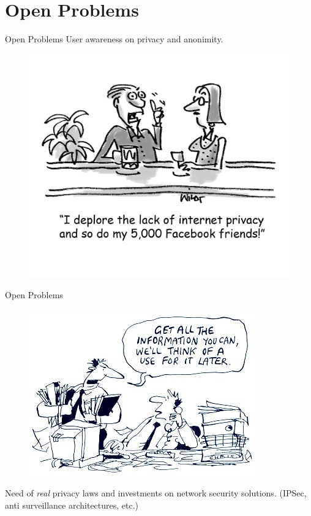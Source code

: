 
\section{Open Problems}
\begin{frame}{Open Problems}
	User awareness on privacy and anonimity.
		\begin{figure}
				\centering
				\includegraphics[scale=0.50]{imgs/comic1.jpg}
			\end{figure}
	
\end{frame}

\begin{frame}{Open Problems}
	
	\begin{figure}
		\centering
		\includegraphics[scale=0.50]{imgs/comic2.jpg}
	\end{figure}

	Need of \emph{real} privacy laws and investments on network
security solutions. (IPSec, anti surveillance architectures, etc.)
\end{frame}
